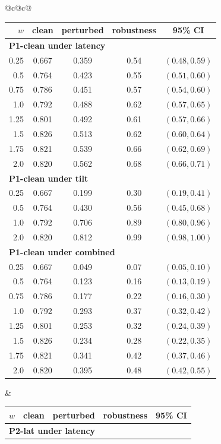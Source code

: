 \begin{tabular}{@{}c@{\hspace{1.5em}}c@{}}
\begin{tabular}[t]{rcccc}
\toprule
$w$ & clean & perturbed & robustness & 95\% CI \\
\midrule
\multicolumn{5}{l}{\textbf{P1-clean under latency}} \\
0.25 & 0.667 & 0.359 & 0.54 & $(0.48,0.59)$ \\
0.5 & 0.764 & 0.423 & 0.55 & $(0.51,0.60)$ \\
0.75 & 0.786 & 0.451 & 0.57 & $(0.54,0.60)$ \\
1.0 & 0.792 & 0.488 & 0.62 & $(0.57,0.65)$ \\
1.25 & 0.801 & 0.492 & 0.61 & $(0.57,0.66)$ \\
1.5 & 0.826 & 0.513 & 0.62 & $(0.60,0.64)$ \\
1.75 & 0.821 & 0.539 & 0.66 & $(0.62,0.69)$ \\
2.0 & 0.820 & 0.562 & 0.68 & $(0.66,0.71)$ \\
\midrule
\multicolumn{5}{l}{\textbf{P1-clean under tilt}} \\
0.25 & 0.667 & 0.199 & 0.30 & $(0.19,0.41)$ \\
0.5 & 0.764 & 0.430 & 0.56 & $(0.45,0.68)$ \\
1.0 & 0.792 & 0.706 & 0.89 & $(0.80,0.96)$ \\
2.0 & 0.820 & 0.812 & 0.99 & $(0.98,1.00)$ \\
\midrule
\multicolumn{5}{l}{\textbf{P1-clean under combined}} \\
0.25 & 0.667 & 0.049 & 0.07 & $(0.05,0.10)$ \\
0.5 & 0.764 & 0.123 & 0.16 & $(0.13,0.19)$ \\
0.75 & 0.786 & 0.177 & 0.22 & $(0.16,0.30)$ \\
1.0 & 0.792 & 0.293 & 0.37 & $(0.32,0.42)$ \\
1.25 & 0.801 & 0.253 & 0.32 & $(0.24,0.39)$ \\
1.5 & 0.826 & 0.234 & 0.28 & $(0.22,0.35)$ \\
1.75 & 0.821 & 0.341 & 0.42 & $(0.37,0.46)$ \\
2.0 & 0.820 & 0.395 & 0.48 & $(0.42,0.55)$ \\
\bottomrule
\end{tabular}
&
\begin{tabular}[t]{rcccc}
\toprule
$w$ & clean & perturbed & robustness & 95\% CI \\
\midrule
\multicolumn{5}{l}{\textbf{P2-lat under latency}} \\

\end{tabular}
\end{tabular}
